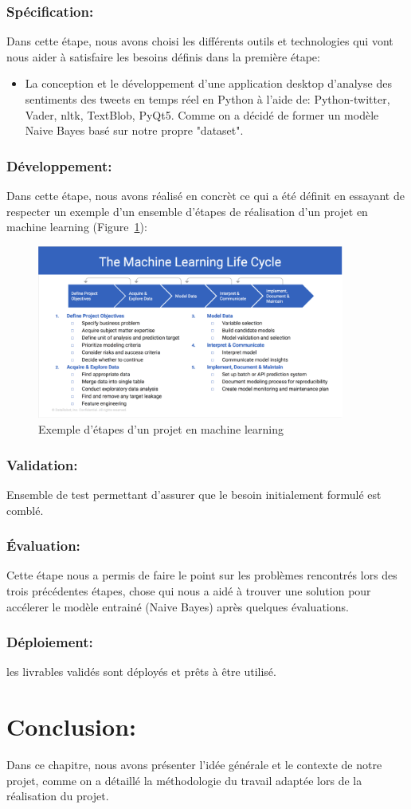 \subsubsection{Spécification:}
Dans cette étape, nous avons choisi les différents outils et technologies qui vont nous aider à satisfaire les besoins définis dans la première étape: 
\begin{itemize}
    \item La conception et le développement d'une application desktop d'analyse des sentiments des tweets en temps réel en Python à l'aide de: Python-twitter, Vader, nltk, TextBlob, PyQt5. Comme on a décidé de former un modèle Naive Bayes basé sur notre propre "dataset". 
\end{itemize} 

\subsubsection{Développement:}
Dans cette étape, nous avons réalisé en concrèt ce qui a été définit en essayant de respecter un exemple d'un ensemble d'étapes de réalisation d'un projet en machine learning (Figure~\ref{fig:machinelearninglifecycle}):
\begin{figure}
    \centering
    \includegraphics[width=0.9\textwidth]{contexte-generale/assets/machinelearning.png}
    \caption{Exemple d'étapes d'un projet en machine learning}
    \label{fig:machinelearninglifecycle}
\end{figure}

\subsubsection{Validation:}
Ensemble de test permettant d’assurer que le besoin initialement formulé est comblé.

\subsubsection{Évaluation:}
Cette étape nous a permis de faire le point sur les problèmes rencontrés lors des trois précédentes étapes, chose qui nous a aidé à trouver une solution pour accélerer le modèle entrainé (Naive Bayes) après quelques évaluations.

\subsubsection{Déploiement:}
les livrables validés sont déployés et prêts à être utilisé.

\section{Conclusion:}
Dans ce chapitre, nous avons présenter l'idée générale et le contexte de notre projet, comme on a détaillé la méthodologie du travail adaptée lors de la réalisation du projet.
